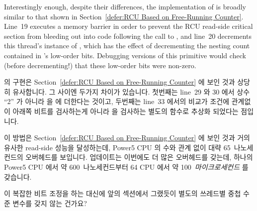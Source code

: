 Interestingly enough, despite their  differences,
the implementation of 
is broadly similar to that shown in
Section~\ref{defer:RCU Based on Free-Running Counter}.
Line~19 executes a memory barrier in order to prevent the RCU read-side
critical section from bleeding out into code following the call
to , and
line~20 decrements this thread's instance of ,
which has the effect of decrementing the nesting count contained in
's low-order bits.
Debugging versions of this primitive would check (before decrementing!)
that these low-order bits were non-zero.
\fi

 의 구현은
Section~\ref{defer:RCU Based on Free-Running Counter} 에 보인 것과 상당히
유사합니다.
그 사이엔 두가지 차이가 있습니다.
첫번째는 line~29 와 30 에서 상수 ``2'' 가 아니라  을
 에 더한다는 것이고, 두번째는 line~33 에서의 비교가 조건에
관계없이 아래쪽 비트를 검사하는게 아니라  을 검사하는
별도의 함수로 추상화 되었다는 점입니다.
\iffalse

The implementation of \co{synchronize_rcu()} is quite similar to
that shown in
Section~\ref{defer:RCU Based on Free-Running Counter}.
There are two differences.
The first is that lines~29 and~30 adds \co{RCU_GP_CTR_BOTTOM_BIT}
to the global \co{rcu_gp_ctr} instead of adding the constant ``2'',
and the second is that the comparison on line~33 has been abstracted
out to a separate function, where it checks the bit indicated
by \co{RCU_GP_CTR_BOTTOM_BIT} instead of unconditionally checking
the low-order bit.
\fi

이 방법은
Section~\ref{defer:RCU Based on Free-Running Counter} 에 보인 것과 거의 유사한
read-side 성능을 달성하는데, Power5 CPU 의 수와 관계 없이 대략 65~나노세컨드의
오버헤드를 보입니다.
업데이트는 이번에도 더 많은 오버헤드를 갖는데, 하나의 Power5 CPU 에서 약
600~나노세컨드부터 64 CPU 에서 약 100~\emph{마이크로세컨드} 를 갖습니다.
\iffalse

This approach achieves read-side performance almost equal to that
shown in
Section~\ref{defer:RCU Based on Free-Running Counter}, incurring
roughly 65~nanoseconds of overhead regardless of the number of
Power5 CPUs.
Updates again incur more overhead, ranging from about 600~nanoseconds on
a single Power5 CPU to more than 100~\emph{microseconds} on 64
such CPUs.
\fi

\QuickQuiz{}
	이 복잡한 비트 조정을 하는 대신에 앞의 섹션에서 그랬듯이 별도의
	쓰레드별 중첩 수준 변수를 갖지 않는 건가요?
	\iffalse


